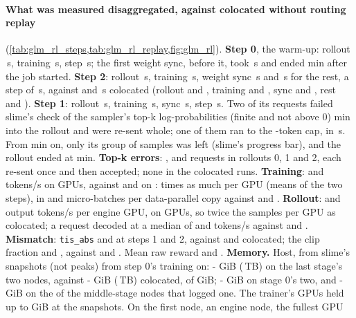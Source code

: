 \paragraph{What was measured disaggregated, against colocated without routing replay} (\cref{tab:glm_rl_steps,tab:glm_rl_replay,fig:glm_rl}). \textbf{Step 0}, the warm-up: rollout \TriGrDgWarmRollout\,s, training \TriGrDgWarmTrain\,s, step \TriGrDgWarmStep\,s; the first weight sync, before it, took \TriGrDgSyncFirst\,s and ended \TriGrDgStartup{} min after the job started. \textbf{Step 2}: rollout \TriGrDgRolloutTwo\,s, training \TriGrDgTrainTwo\,s, weight sync \TriGrDgSyncTwo\,s and \TriGrDgRestTwo\,s for the rest, a step of \TriGrDgStepTwo\,s, against \TriGrStepOne{} and \TriGrStepTwo\,s colocated (rollout \TriGrRolloutOne{} and \TriGrRolloutTwo, training \TriGrTrainOne{} and \TriGrTrainTwo, sync \TriGrSyncOne{} and \TriGrSyncTwo, rest \TriGrRestOne{} and \TriGrRestTwo). \textbf{Step 1}: rollout \TriGrDgRolloutOne\,s, training \TriGrDgTrainOne\,s, sync \TriGrDgSyncOne\,s, step \TriGrDgStepOne\,s. Two of its requests failed slime's check of the sampler's top-k log-probabilities (finite and not above 0) \TriGrDgRetryMinOne{} min into the rollout and were re-sent whole; one of them ran to the \TriGrMaxResp-token cap, in \TriGrDgLatMaxOne\,s. From \TriGrDgLastGroupMinOne{} min on, only its group of samples was left (slime's progress bar), and the rollout ended at \TriGrDgRolloutMinOne{} min. \textbf{Top-k errors}: \TriGrDgTopkWarm, \TriGrDgTopkOne{} and \TriGrDgTopkTwo{} requests in rollouts 0, 1 and 2, each re-sent once and then accepted; none in the colocated runs. \textbf{Training}: \TriGrDgTrainTokOne{} and \TriGrDgTrainTokTwo{} tokens/s on \TriGrDgTrainerGpus{} GPUs, against \TriGrTrainTokOne{} and \TriGrTrainTokTwo{} on \TriGrGpus: \TriGrDgTrainPerGpu{} times as much per GPU (means of the two steps), in \TriGrDgMicroOne{} and \TriGrDgMicroTwo{} micro-batches per data-parallel copy against \TriGrMicroOne{} and \TriGrMicroTwo. \textbf{Rollout}: \TriGrDgRollTokOne{} and \TriGrDgRollTokTwo{} output tokens/s per engine GPU, on \TriGrDgEngineGpus{} GPUs, so twice the samples per GPU as colocated; a request decoded at a median of \TriGrDgDecodeReqOne{} and \TriGrDgDecodeReqTwo{} tokens/s against \TriGrDecodeReqOne{} and \TriGrDecodeReqTwo. \textbf{Mismatch}: \texttt{tis\_abs} \TriGrDgTisAbsOne{} and \TriGrDgTisAbsTwo{} at steps 1 and 2, against \TriGrTisAbsOne{} and \TriGrTisAbsTwo{} colocated; the clip fraction \TriGrDgTisClipOne{} and \TriGrDgTisClipTwo, against \TriGrTisClipOne{} and \TriGrTisClipTwo. Mean raw reward \TriGrDgRewardOne{} and \TriGrDgRewardTwo. \textbf{Memory.} Host, from slime's snapshots (not peaks) from step 0's training on: \TriGrDgHostLastLo-\TriGrDgHostLastHi{} GiB (\TriGrDgHostLastTb\,TB) on the last stage's two nodes, against \TriGrHostLastLo-\TriGrHostLastHi{} GiB (\TriGrHostLastTb\,TB) colocated, of \TriGrHostTotal{} GiB; \TriGrDgHostFirstLo-\TriGrDgHostFirstHi{} GiB on stage 0's two, and \TriGrDgHostMidLo-\TriGrDgHostMidHi{} GiB on the \TriGrDgHostMidNodes{} of the \TriGrDgHostMidAll{} middle-stage nodes that logged one. The trainer's GPUs held up to \TriGrDgGpuTrainer{} GiB at the snapshots. On the first node, an engine node, the fullest GPU 